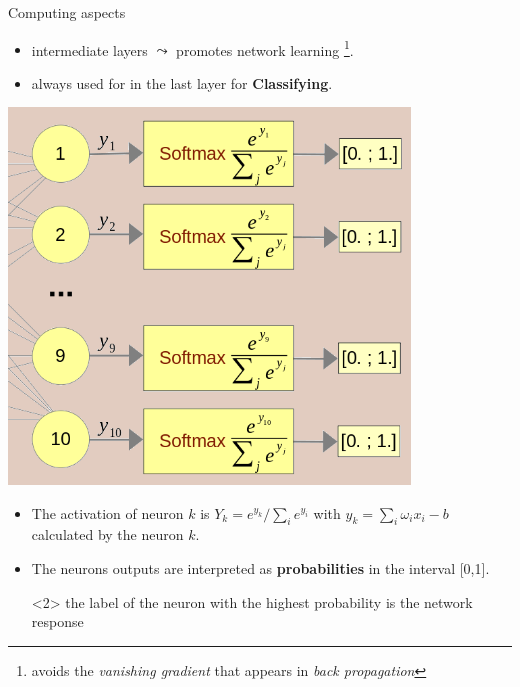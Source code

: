 \documentclass[10pt,serif,mathserif,compress,hyperref={colorlinks}]{beamer}
\begin{document}
\begin{frame}{Computing aspects}
  \vspace*{-2mm}

  \begin{itemize}
    
  \item intermediate layers $\leadsto$  promotes network learning
    \footnote{{\tiny avoids the {\em vanishing gradient} that appears in {\em back propagation}}}.\smallskip
    
  \item {} always used for in the last layer for {\bf Classifying}.
    
  \end{itemize}
  \smallskip
  
  \begin{tcolorbox}[add to width=.7cm, title={Example: ativation function {\em softmax} for the last layer, 10 classes}]
    
    \begin{minipage}{.55\textwidth}
      \vspace*{-2mm}\includegraphics[width=0.8\textwidth]{images/softmax-2.png}
    \end{minipage}\hspace*{5mm}\begin{minipage}{.45\textwidth}
      {\small
        \begin{itemize}
        \item The activation of neuron $k$ is $Y_k = e^{y_k}/\sum_i{e^{y_i}}$
          with $y_k = \sum_i \omega_i x_i - b$ calculated by the neuron $k$.
        \item The neurons outputs are interpreted as {\bf probabilities} in the interval [0,1].
        \item[\Black{$\leadsto$}] <2> the label of the neuron with the highest probability is the network response
      \end{itemize}}
    \end{minipage}
  \end{tcolorbox}
    
\end{frame}
\end{document}

